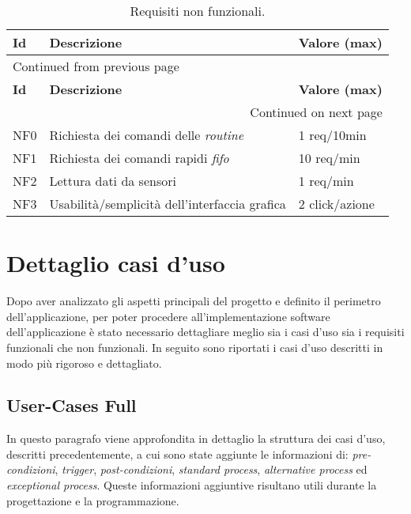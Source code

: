\documentclass[onecolumn,a4paper]{article}
\begin{document}
\begin{longtable}{|l|l|p{3cm}|}
\caption{Requisiti non funzionali.}
\\
\hline
\textbf{Id} & \textbf{Descrizione} & \textbf{Valore (max)}\\
\hline
\endfirsthead
\multicolumn{3}{l}{Continued from previous page} \\
\hline

\textbf{Id} & \textbf{Descrizione} & \textbf{Valore (max)} \\

\hline
\endhead
\hline\multicolumn{3}{r}{Continued on next page} \\
\endfoot
\endlastfoot
\hline
NF0 & Richiesta dei comandi delle \emph{routine} & 1 req/10min\\
\hline
NF1 & Richiesta dei comandi rapidi \emph{fifo} & 10 req/min\\
\hline
NF2 & Lettura dati da sensori & 1 req/min\\
\hline
NF3 & Usabilità/semplicità dell'interfaccia grafica & 2 click/azione\\
\hline
\end{longtable}

\section{Dettaglio casi d'uso}
\label{sec:org5ef4bb4}
Dopo aver analizzato gli aspetti principali del progetto e definito il perimetro dell'applicazione, per poter procedere all'implementazione software dell'applicazione è stato necessario dettagliare meglio sia i casi d'uso sia i requisiti funzionali che non funzionali. In seguito sono riportati i casi d'uso descritti in modo più rigoroso e dettagliato. 

\subsection{User-Cases Full}
\label{sec:org4269490}
In questo paragrafo viene approfondita in dettaglio la struttura dei casi d’uso, descritti precedentemente, a cui sono state aggiunte le informazioni di: \emph{pre-condizioni}, \emph{trigger}, \emph{post-condizioni}, \emph{standard process}, \emph{alternative process} ed \emph{exceptional process}. Queste informazioni aggiuntive risultano utili durante la progettazione e la programmazione. 
\end{document}
